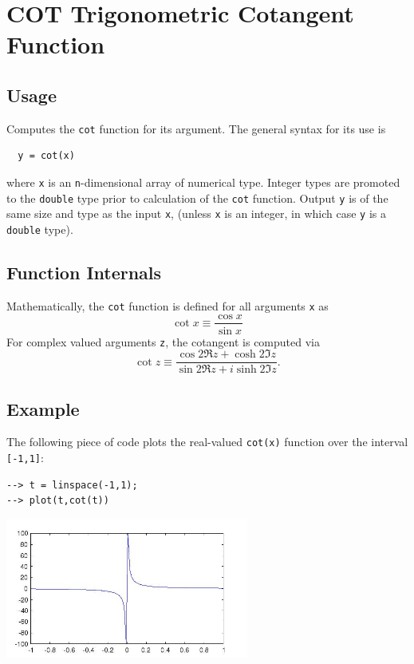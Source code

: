 \section{COT Trigonometric Cotangent Function}

\subsection{Usage}

Computes the \verb|cot| function for its argument.  The general
syntax for its use is
\begin{verbatim}
  y = cot(x)
\end{verbatim}
where \verb|x| is an \verb|n|-dimensional array of numerical type.
Integer types are promoted to the \verb|double| type prior to
calculation of the \verb|cot| function.  Output \verb|y| is of the
same size and type as the input \verb|x|, (unless \verb|x| is an
integer, in which case \verb|y| is a \verb|double| type).  
\subsection{Function Internals}

Mathematically, the \verb|cot| function is defined for all 
arguments \verb|x| as
\[
  \cot x \equiv \frac{\cos x}{\sin x}
\]
For complex valued arguments \verb|z|, the cotangent is computed via
\[
  \cot z \equiv \frac{\cos 2 \Re z + \cosh 2 \Im z}{\sin 2 \Re z + 
  i \sinh 2 \Im z}.
\]
\subsection{Example}

The following piece of code plots the real-valued \verb|cot(x)|
function over the interval \verb|[-1,1]|:
\begin{verbatim}
--> t = linspace(-1,1);
--> plot(t,cot(t))
\end{verbatim}


\centerline{\includegraphics[width=8cm]{cotplot}}

